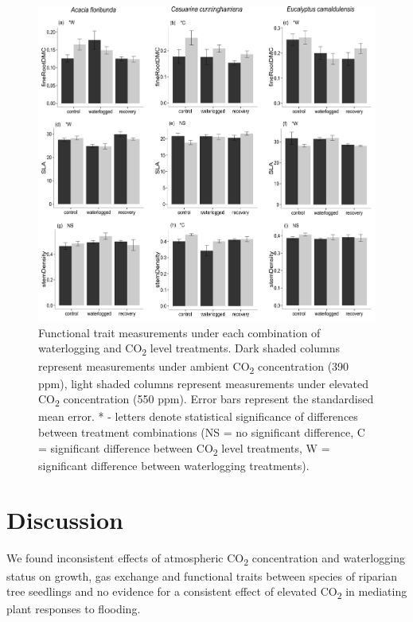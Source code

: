 \documentclass[12pt,a4paper]{memoir}
\begin{document}
\begin{figure}[h!t]
\begin{center}
\includegraphics[width=\linewidth,keepaspectratio=true]{traits2.png} %
\caption[Functional trait measurements under each combination of waterlogging and CO\textsubscript{2} level treatments.]{\small{Functional trait measurements under each combination of waterlogging and CO\textsubscript{2} level treatments. Dark shaded columns represent measurements under ambient CO\textsubscript{2} concentration (390 ppm), light shaded columns represent measurements under elevated CO\textsubscript{2} concentration (550 ppm). Error bars represent the standardised mean error. * - letters denote statistical significance of differences between treatment combinations (NS = no significant difference, C = significant difference between CO\textsubscript{2} level treatments, W = significant difference between waterlogging treatments).}} %
\label{Ch5_F3} %
\end{center}
\end{figure}

\section{Discussion}
We found inconsistent effects of atmospheric CO\textsubscript{2} concentration and waterlogging status on growth, gas exchange and functional traits between species of riparian tree seedlings and no evidence for a consistent effect of elevated CO\textsubscript{2} in mediating plant responses to flooding. 
\end{document}
